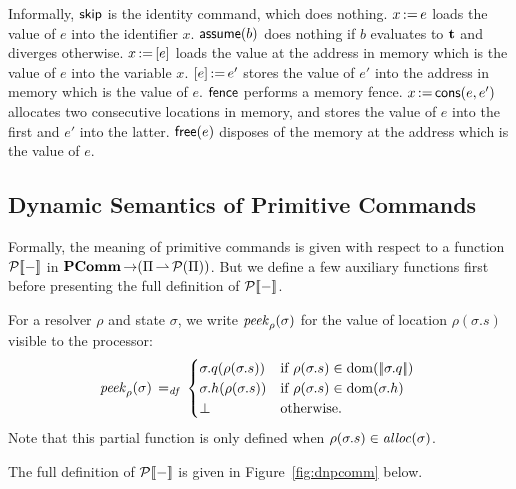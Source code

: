 \documentclass[11pt]{report}
\begin{document}
Informally, $\operatorname{\mathsf{skip}}$ is the identity command, which does nothing. $x \operatorname{:\!=} e$ loads the value of $e$ into the identifier $x$. $\operatorname{\mathsf{assume}}(b)$ does nothing if $b$ evaluates to $\mathbf{t}$ and diverges otherwise. $x \operatorname{:\!=} \left[ e \right]$ loads the value at the address in memory which is the value of $e$ into the variable $x$. $\left[ e \right] \operatorname{:\!=} e'$ stores the value of $e'$ into the address in memory which is the value of $e$. $\operatorname{\mathsf{fence}}$ performs a memory fence. $x \operatorname{:\!=} \operatorname{\mathsf{cons}}(e, e')$ allocates two consecutive locations in memory, and stores the value of $e$ into the first and $e'$ into the latter. $\operatorname{\mathsf{free}}(e)$ disposes of the memory at the address which is the value of $e$. 

\subsection{Dynamic Semantics of Primitive Commands} %
\label{sub:dynamic_semantics_of_primitive_commands}

Formally, the meaning of primitive commands is given with respect to a function $\mathcal{P}[\![-]\!]$ in $\mathbf{PComm} \operatorname{\rightarrow} (\Pi \operatorname{\rightharpoonup} \mathcal{P}(\Pi))$. But we define a few auxiliary functions first before presenting the full definition of $\mathcal{P}[\![-]\!]$. 

For a resolver $\rho$ and state $\sigma$,  we write $\mathit{peek}_{\rho}(\sigma)$ for the value of location $\rho(\sigma.s)$ visible to the processor: \begin{equation}
	\label{eq:speek}
	\mathit{peek}_{\rho}(\sigma) \operatorname{\;=_{\mathit{df}}\;} \begin{cases}
		\sigma.q(\rho(\sigma.s)) & \text{if $\rho(\sigma.s) \in \operatorname{\mathrm{dom}}(|\!|\sigma.q|\!|)$ } \\
		\sigma.h(\rho(\sigma.s)) & \text{if $\rho(\sigma.s) \in \operatorname{\mathrm{dom}}(\sigma.h)$} \\
		\bot & \text{otherwise.}
	\end{cases} 
\end{equation}
Note that this partial function is only defined when $\rho(\sigma.s) \in 
\mathit{alloc}(\sigma)$. 

The full definition of $\mathcal{P}[\![-]\!]$ is given in Figure~\ref{fig:dnpcomm} below. 
\end{document}
